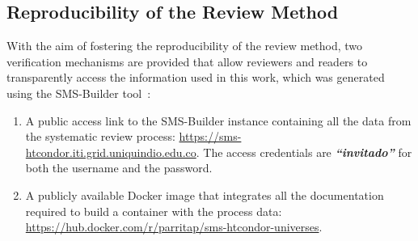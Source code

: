 \subsection{Reproducibility of the Review Method}
\label{sec:reproducibilidad}

With the aim of fostering the reproducibility of the review method, two verification mechanisms are provided that allow reviewers and readers to transparently access the information used in this work, which was generated using the SMS-Builder tool~\cite{sms-builder-repo}: \\

\begin{enumerate}
	\item A public access link to the SMS-Builder instance containing all the data from the systematic review process: \url{https://sms-htcondor.iti.grid.uniquindio.edu.co}. The access credentials are \hbox{\textbf{\textit{``invitado''}}} for both the username and the password.
	\item A publicly available Docker image that integrates all the documentation required to build a container with the process data: \url{https://hub.docker.com/r/parritap/sms-htcondor-universes}.
\end{enumerate}
